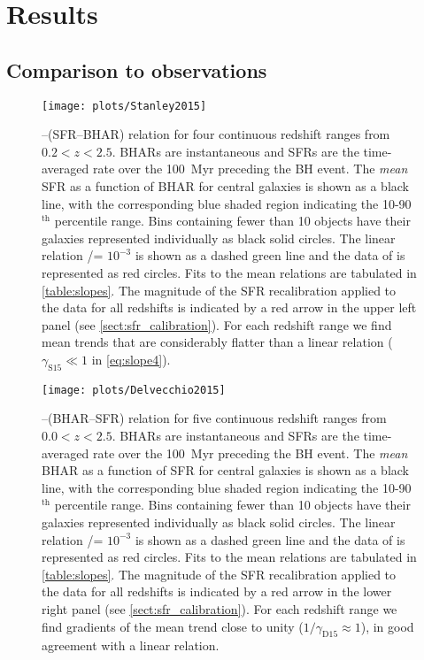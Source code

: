 \section{Results}
\label{sect:results}

\subsection{Comparison to observations}
\label{sect:observations}

\begin{figure}
\texttt{[image: plots/Stanley2015]}

\caption{\SFR--\BHAR (SFR--BHAR) relation for four continuous redshift ranges
from $0.2 < z < 2.5$. BHARs are instantaneous and SFRs are the time-averaged
rate over the 100~Myr preceding the BH event. The \textit{mean} SFR as a
function of BHAR for central galaxies is shown as a black line, with the
corresponding blue shaded region indicating the 10-90$^{\mathrm{th}}$
percentile range. Bins containing fewer than 10 objects have their galaxies
represented individually as black solid circles.  The linear relation
\BHAR/\SFR = $10^{-3}$ is shown as a dashed green line and the data of
\citet{Stanley2015} is represented as red circles.  Fits to the \eagle mean
relations are tabulated in \cref{table:slopes}. The magnitude of the SFR
recalibration applied to the data for all redshifts is indicated by a red arrow
in the upper left panel (see \cref{sect:sfr_calibration}). For each redshift
range we find mean trends that are considerably flatter than a linear relation
($\gamma_{\mathrm{S15}} \ll 1$ in \cref{eq:slope4}).}

\label{fig:stanley2015}
\end{figure}

\begin{figure}
\texttt{[image: plots/Delvecchio2015]}

\caption{\BHAR--\SFR (BHAR--SFR) relation for five continuous redshift ranges
from $0.0 < z < 2.5$. BHARs are instantaneous and SFRs are the time-averaged
rate over the 100~Myr preceding the BH event. The \textit{mean} BHAR as a
function of SFR for central galaxies is shown as a black line, with the
corresponding blue shaded region indicating the 10-90$^{\mathrm{th}}$
percentile range. Bins containing fewer than 10 objects have their galaxies
represented individually as black solid circles.  The linear relation
\BHAR/\SFR = $10^{-3}$ is shown as a dashed green line and the data of
\citet{Delvecchio2015} is represented as red circles. Fits to the \eagle mean
relations are tabulated in \cref{table:slopes}. The magnitude of the SFR
recalibration applied to the data for all redshifts is indicated by a red arrow
in the lower right panel (see \cref{sect:sfr_calibration}). For each redshift
range we find gradients of the mean trend close to unity ($1 /
\gamma_{\mathrm{D15}} \approx 1$), in good agreement with a linear relation.}

\label{fig:delvecchio2015}
\end{figure}

